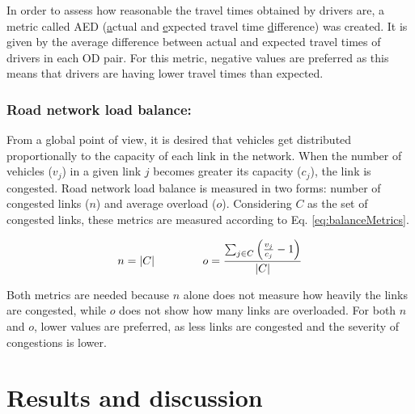 \documentclass{RITA}
\newcommand{\linkCap}{\ensuremath{c_j}}		%
\newcommand{\veh}{\ensuremath{v}}		%
\newcommand{\congRoads}{\ensuremath{C}}		%
\newcommand{\numCong}{\ensuremath{n}}		%
\newcommand{\overLoadFactor}{\ensuremath{o}}	%
\begin{document}
In order to assess how reasonable the travel times obtained by drivers are, a metric called AED (\underline{a}ctual and \underline{e}xpected travel time \underline{d}ifference) was created. It is given by the average difference between actual and expected travel times of drivers in each OD pair. For this metric, negative values are preferred as this means that drivers are having lower travel times than expected. %

\subsubsection{Road network load balance:}
\label{sec:loadBalanceMetrics}
From a global point of view, it is desired that vehicles get distributed proportionally to the capacity of each link in the network. When the number of vehicles ($\veh_j$) in a given link $j$ becomes greater its capacity ($\linkCap$), the link is congested. Road network load balance is measured in two forms: number of congested links ($n$) and average overload ($o$). Considering $C$ as the set of congested links, these metrics are measured according to Eq. \eqref{eq:balanceMetrics}. 

\begin{equation}
\label{eq:balanceMetrics}
\numCong = |\congRoads| \hspace{1.5cm}  \overLoadFactor = \frac{ \sum_{\substack{j \in \congRoads}} \left(\frac{\veh_j}{\linkCap} -1 \right)}{|C|}
\end{equation}

Both metrics are needed because $n$ alone does not measure how heavily the links are congested, while $o$ does not show how many links are overloaded. For both $n$ and $o$, lower values are preferred, as less links are congested and the severity of congestions is lower.

\section{Results and discussion}
\label{sec:results}
\end{document}
